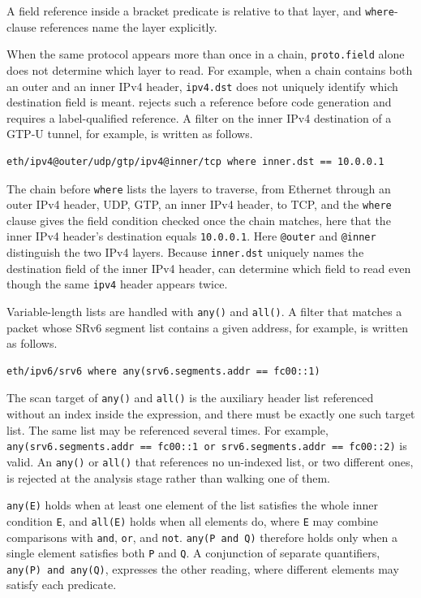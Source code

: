 A field reference inside a bracket predicate is relative to that
layer, and \texttt{where}-clause references name the layer
explicitly.

When the same protocol appears more than once in a chain,
\texttt{proto.field} alone does not determine which layer to read.
For example, when a chain contains both an outer and an inner IPv4 header,
\texttt{ipv4.dst} does not uniquely identify which destination field
is meant. \kunai rejects such a reference before code generation and
requires a label-qualified reference. A filter on the inner IPv4
destination of a GTP-U tunnel, for example, is written as follows.

\begin{lstlisting}[style=kunai]
eth/ipv4@outer/udp/gtp/ipv4@inner/tcp where inner.dst == 10.0.0.1
\end{lstlisting}

The chain before \texttt{where} lists the layers to traverse, from
Ethernet through an outer IPv4 header, UDP, GTP, an inner IPv4 header,
to TCP, and the \texttt{where} clause gives the field condition checked
once the chain matches, here that the inner IPv4 header's destination
equals \texttt{10.0.0.1}. Here \texttt{@outer} and \texttt{@inner}
distinguish the two IPv4 layers. Because \texttt{inner.dst} uniquely
names the destination field of the inner IPv4 header, \kunai can
determine which field to read even though the same \texttt{ipv4}
header appears twice.

Variable-length lists are handled with \texttt{any()} and
\texttt{all()}. A filter that matches a packet whose SRv6 segment list
contains a given address, for example, is written as follows.

\begin{lstlisting}[style=kunai]
eth/ipv6/srv6 where any(srv6.segments.addr == fc00::1)
\end{lstlisting}

The scan target of \texttt{any()} and \texttt{all()} is the auxiliary
header list referenced without an index inside the expression, and
there must be exactly one such target list. The same list may be
referenced several times. For example,
\texttt{any(srv6.segments.addr == fc00::1 or srv6.segments.addr ==
fc00::2)} is valid. An \texttt{any()} or \texttt{all()} that references no un-indexed list, or
two different ones, is rejected at the analysis stage rather than
walking one of them.

\texttt{any(E)} holds when at least one element of the list satisfies
the whole inner condition \texttt{E}, and \texttt{all(E)} holds when
all elements do, where \texttt{E} may combine comparisons with
\texttt{and}, \texttt{or}, and \texttt{not}. \texttt{any(P and Q)}
therefore holds only when a single element satisfies both \texttt{P}
and \texttt{Q}. A conjunction of separate quantifiers, \texttt{any(P)
and any(Q)}, expresses the other reading, where different elements may
satisfy each predicate.

